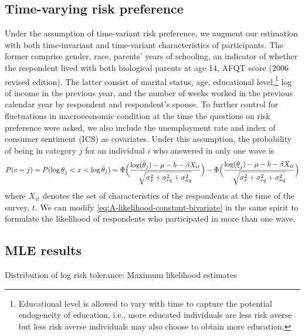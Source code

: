 \documentclass[emulatestandardclasses, 10pt, abstract = true]{scrartcl}
\begin{document}
\subsection{Time-varying risk preference}
Under the assumption of time-variant risk preference, we augment our estimation with both time-invariant and time-variant characteristics of participants. The former comprise gender, race, parents' years of schooling, an indicator of whether the respondent lived with both biological parents at age 14, AFQT score (2006 revised edition). The latter consist of marital status, age, educational level,\footnote{Educational level is allowed to vary with time to capture the potential endogeneity of education, i.e., more educated individuals are less risk averse but less risk averse individuals may also choose to obtain more education.} log of income in the previous year, and the number of weeks worked in the previous calendar year by respondent and respondent's spouse. To further control for fluctuations in macroeconomic condition at the time the questions on risk preference were asked, we also include the unemployment rate and index of consumer sentiment (ICS) as covariates. Under this assumption, the probability of being in category $j$ for an individual $i$ who answered in only one wave is
\begin{equation}
	P(c=j)=P(\log\underline{\theta}_j<x<\log\bar{\theta}_j)=\Phi\Big({\log(\bar{\theta}_j)-\mu-b-\beta X_{it}\over\sqrt{\sigma_x^2+\sigma_{eq}^2+\sigma_{\kappa q}^2}}\Big)-\Phi\Big({\log(\underline{\theta}_j)-\mu-b-\beta X_{it}\over\sqrt{\sigma_x^2+\sigma_{eq}^2+\sigma_{\kappa q}^2}}\Big) 
	\label{eq:A-likelihood-floating-univariate}	
\end{equation}
where $X_{it}$ denotes the set of characteristics of the respondents at the time of the survey, $t$. We can modify \eqref{eq:A-likelihood-constant-bivariate} in the same spirit to formulate the likelihood of respondents who participated in more than one wave. 

\subsection{MLE results}



\begin{table}[!htbp]
	\centering \setlength{\extrarowheight}{0.2em}
	\caption{Distribution of log risk tolerance: Maximum likelihood estimates}
	
	\label{table:appendix-mle}
\end{table}
\end{document}

